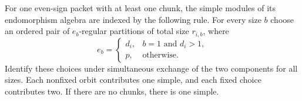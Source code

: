 \begin{lemma}\label{end:even-algebra}
For one even-sign packet with at least one chunk, the simple
modules of its endomorphism algebra are indexed by the following
rule.  For every size $b$ choose an ordered pair of
$e_b$-regular partitions of total size $r_{i,b}$, where
\begin{equation}\label{end:quantum-e}
 e_b=\begin{cases}
 d_i,&b=1\text{ and }d_i>1,\\
 p,&\text{otherwise}.
 \end{cases}
\end{equation}
Identify these choices under simultaneous exchange of the two
components for all sizes.  Each nonfixed orbit contributes one
simple, and each fixed choice contributes two.  If there are no
chunks, there is one simple.
\end{lemma}


